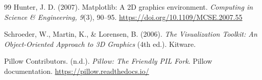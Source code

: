 \documentclass{article}
\begin{document}
\begin{normalsize}
\begin{thebibliography}{99}
Hunter, J. D. (2007). Matplotlib: A 2D graphics environment. \textit{Computing in Science \& Engineering, 9}(3), 90--95. 
\url{https://doi.org/10.1109/MCSE.2007.55}

Schroeder, W., Martin, K., \& Lorensen, B. (2006). \textit{The Visualization Toolkit: An Object-Oriented Approach to 3D Graphics} (4th ed.). Kitware.

Pillow Contributors. (n.d.). \textit{Pillow: The Friendly PIL Fork}. Pillow documentation. 
\url{https://pillow.readthedocs.io/}

\end{thebibliography}

\end{normalsize}
\end{document}
